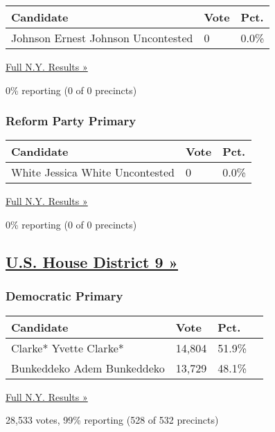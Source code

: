 \begin{longtable}[]{@{}lll@{}}
\toprule
Candidate & Vote & Pct.\tabularnewline
\midrule
\endhead
 Johnson Ernest Johnson Uncontested & 0 & 0.0\%\tabularnewline
\bottomrule
\end{longtable}

\href{https://www.nytimes3xbfgragh.onion/elections/results/new-york}{Full
N.Y. Results »}

0\% reporting (0 of 0 precincts)

\hypertarget{reform-party-primary}{%
\subsubsection{Reform Party Primary}\label{reform-party-primary}}

\begin{longtable}[]{@{}lll@{}}
\toprule
Candidate & Vote & Pct.\tabularnewline
\midrule
\endhead
 White Jessica White Uncontested & 0 & 0.0\%\tabularnewline
\bottomrule
\end{longtable}

\href{https://www.nytimes3xbfgragh.onion/elections/results/new-york}{Full
N.Y. Results »}

0\% reporting (0 of 0 precincts)

\hypertarget{us-house-district-9-}{%
\subsection{\texorpdfstring{\href{https://www.nytimes3xbfgragh.onion/elections/results/new-york-house-district-9-primary-election}{U.S.
House District 9
»}}{U.S. House District 9 »}}\label{us-house-district-9-}}

\hypertarget{democratic-primary-9}{%
\subsubsection{Democratic Primary}\label{democratic-primary-9}}

\begin{longtable}[]{@{}llll@{}}
\toprule
Candidate & Vote & Pct. &\tabularnewline
\midrule
\endhead
 Clarke* Yvette Clarke* & 14,804 & 51.9\% &\tabularnewline
 Bunkeddeko Adem Bunkeddeko & 13,729 & 48.1\% &\tabularnewline
\bottomrule
\end{longtable}

\href{https://www.nytimes3xbfgragh.onion/elections/results/new-york}{Full
N.Y. Results »}

28,533 votes, 99\% reporting (528 of 532 precincts)

